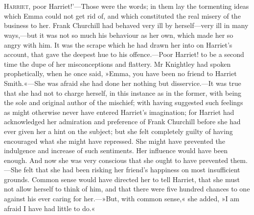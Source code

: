 \chapter[Chapter \thechapter]{}
	\lettrine[lines=4,lraise=0.3,ante=`]{H}{arriet,} poor Harriet!'—Those were the words; in them lay the tormenting ideas which Emma could not get rid of, and which constituted the real misery of the business to her. Frank Churchill had behaved very ill by herself—very ill in many ways,—but it was not so much his behaviour as her own, which made her so angry with him. It was the scrape which he had drawn her into on Harriet's account, that gave the deepest hue to his offence.—Poor Harriet! to be a second time the dupe of her misconceptions and flattery. Mr Knightley had spoken prophetically, when he once said, »Emma, you have been no friend to Harriet Smith.«—She was afraid she had done her nothing but disservice.—It was true that she had not to charge herself, in this instance as in the former, with being the sole and original author of the mischief; with having suggested such feelings as might otherwise never have entered Harriet's imagination; for Harriet had acknowledged her admiration and preference of Frank Churchill before she had ever given her a hint on the subject; but she felt completely guilty of having encouraged what she might have repressed. She might have prevented the indulgence and increase of such sentiments. Her influence would have been enough. And now she was very conscious that she ought to have prevented them.—She felt that she had been risking her friend's happiness on most insufficient grounds. Common sense would have directed her to tell Harriet, that she must not allow herself to think of him, and that there were five hundred chances to one against his ever caring for her.—»But, with common sense,« she added, »I am afraid I have had little to do.«

